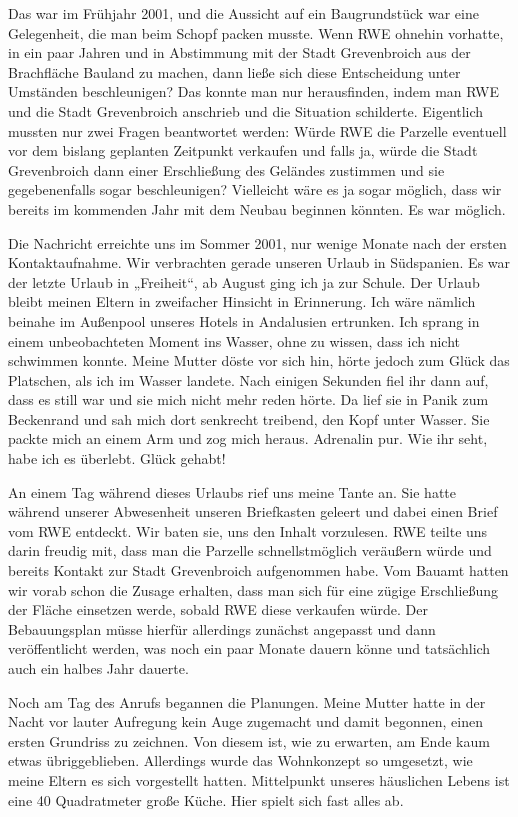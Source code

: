 \documentclass[fontsize=12pt,a4paper,headinclude,DIV=calc,automark]{scrbook}
\begin{document}
Das war im Frühjahr 2001, und die Aussicht auf ein Baugrundstück war eine Gelegenheit, die man beim Schopf packen musste. Wenn RWE ohnehin vorhatte, in ein paar Jahren und in Abstimmung mit der Stadt Grevenbroich aus der Brachfläche Bauland zu machen, dann ließe sich diese Entscheidung unter Umständen beschleunigen? Das konnte man nur herausfinden, indem man RWE und die Stadt Grevenbroich anschrieb und die Situation schilderte. Eigentlich mussten nur zwei Fragen beantwortet werden: Würde RWE die Parzelle eventuell vor dem bislang geplanten Zeitpunkt verkaufen und falls ja, würde die Stadt Grevenbroich dann einer Erschließung des Geländes zustimmen und sie gegebenenfalls sogar beschleunigen? Vielleicht wäre es ja sogar möglich, dass wir bereits im kommenden Jahr mit dem Neubau beginnen könnten. Es war möglich.

Die Nachricht erreichte uns im Sommer 2001, nur wenige Monate nach der ersten Kontaktaufnahme. Wir verbrachten gerade unseren Urlaub in Südspanien. Es war der letzte Urlaub in „Freiheit“, ab August ging ich ja zur Schule. Der Urlaub bleibt meinen Eltern in zweifacher Hinsicht in Erinnerung. Ich wäre nämlich beinahe im Außenpool unseres Hotels in Andalusien ertrunken. Ich sprang in einem unbeobachteten Moment ins Wasser, ohne zu wissen, dass ich nicht schwimmen konnte. Meine Mutter döste vor sich hin, hörte jedoch zum Glück das Platschen, als ich im Wasser landete. Nach einigen Sekunden fiel ihr dann auf, dass es still war und sie mich nicht mehr reden hörte. Da lief sie in Panik zum Beckenrand und sah mich dort senkrecht treibend, den Kopf unter Wasser. Sie packte mich an einem Arm und zog mich heraus. Adrenalin pur. Wie ihr seht, habe ich es überlebt. Glück gehabt!

An einem Tag während dieses Urlaubs rief uns meine Tante an. Sie hatte während unserer Abwesenheit unseren Briefkasten geleert und dabei einen Brief vom RWE entdeckt. Wir baten sie, uns den Inhalt vorzulesen. RWE teilte uns darin freudig mit, dass man die Parzelle schnellstmöglich veräußern würde und bereits Kontakt zur Stadt Grevenbroich aufgenommen habe. Vom Bauamt hatten wir vorab schon die Zusage erhalten, dass man sich für eine zügige Erschließung der Fläche einsetzen werde, sobald RWE diese verkaufen würde. Der Bebauungsplan müsse hierfür allerdings zunächst angepasst und dann veröffentlicht werden, was noch ein paar Monate dauern könne und tatsächlich auch ein halbes Jahr dauerte.

Noch am Tag des Anrufs begannen die Planungen. Meine Mutter hatte in der Nacht vor lauter Aufregung kein Auge zugemacht und damit begonnen, einen ersten Grundriss zu zeichnen. Von diesem ist, wie zu erwarten, am Ende kaum etwas übriggeblieben. Allerdings wurde das Wohnkonzept so umgesetzt, wie meine Eltern es sich vorgestellt hatten. Mittelpunkt unseres häuslichen Lebens ist eine 40 Quadratmeter große Küche. Hier spielt sich fast alles ab.
\end{document}
